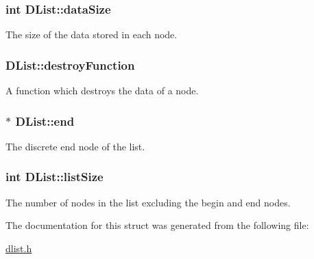 \subsubsection[{\texorpdfstring{data\+Size}{dataSize}}]{\setlength{\rightskip}{0pt plus 5cm}int D\+List\+::data\+Size}\hypertarget{structDList_aac5e5498f12e33cdcf9212802b92ded4}{}\label{structDList_aac5e5498f12e33cdcf9212802b92ded4}
The size of the data stored in each node. 
\subsubsection[{\texorpdfstring{destroy\+Function}{destroyFunction}}]{ D\+List\+::destroy\+Function}\hypertarget{structDList_a039e1b8cd416fceafdb407c1bc51ae4c}{}\label{structDList_a039e1b8cd416fceafdb407c1bc51ae4c}
A function which destroys the data of a node. 
\subsubsection[{\texorpdfstring{end}{end}}]{$\ast$ D\+List\+::end}\hypertarget{structDList_ae11ba36cd0e3bdeac4c7189910993864}{}\label{structDList_ae11ba36cd0e3bdeac4c7189910993864}
The discrete end node of the list. 
\subsubsection[{\texorpdfstring{list\+Size}{listSize}}]{\setlength{\rightskip}{0pt plus 5cm}int D\+List\+::list\+Size}\hypertarget{structDList_a85d2c4c3a5abba8fb8c903571ae72369}{}\label{structDList_a85d2c4c3a5abba8fb8c903571ae72369}
The number of nodes in the list excluding the begin and end nodes. 

The documentation for this struct was generated from the following file\+:\begin{DoxyCompactItemize}
\item 
\hyperlink{dlist_8h}{dlist.\+h}\end{DoxyCompactItemize}

